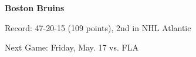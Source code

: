 \textbf{Boston Bruins}

Record: 47-20-15 (109 points), 2nd in NHL Atlantic 

Next Game: Friday, May. 17 vs. FLA